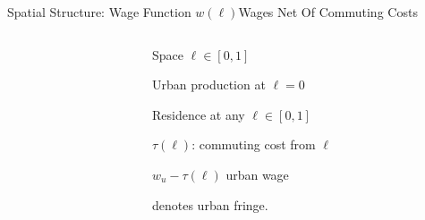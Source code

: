 \documentclass[aspectratio=169]{beamer}
\begin{document}

\begin{frame}{Spatial Structure: Wage Function $w(\ell)$}{Wages Net Of Commuting Costs}
\begin{columns}
\begin{column}{0.7\textwidth}

\end{column}
\begin{column}{0.3\textwidth}
\begin{mide}
\item<1-> Space $\ell \in[0,1]$
\item<2-> Urban production at $\ell=0$
\item<2-> Residence at any $\ell \in[0,1]$
\item<3-> $\tau(\ell)$: commuting cost from $\ell$
\item<3-> $w_u - \tau(\ell)$ urban wage
\item<4-> {\color{red}{$\phi$}} denotes urban fringe.
\end{mide}
\end{column}
\end{columns}
\end{frame}
\end{document}
